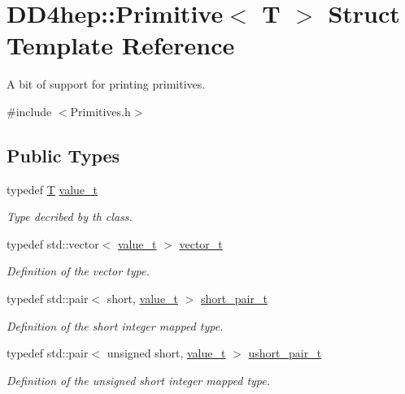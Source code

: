 \hypertarget{struct_d_d4hep_1_1_primitive}{
\section{DD4hep::Primitive$<$ T $>$ Struct Template Reference}
\label{struct_d_d4hep_1_1_primitive}
}


A bit of support for printing primitives.  


{\ttfamily \#include $<$Primitives.h$>$}\subsection*{Public Types}
\begin{DoxyCompactItemize}
\item 
typedef \hyperlink{class_t}{T} \hyperlink{struct_d_d4hep_1_1_primitive_a0639e73bb8f07f99c2d8401f807a7af6}{value\_\-t}
\begin{DoxyCompactList}\small\item\em Type decribed by th class. \item\end{DoxyCompactList}\item 
typedef std::vector$<$ \hyperlink{class_t}{value\_\-t} $>$ \hyperlink{struct_d_d4hep_1_1_primitive_a811bb3e2e990b586cd6669ce73de1c50}{vector\_\-t}
\begin{DoxyCompactList}\small\item\em Definition of the vector type. \item\end{DoxyCompactList}\item 
typedef std::pair$<$ short, \hyperlink{class_t}{value\_\-t} $>$ \hyperlink{struct_d_d4hep_1_1_primitive_a50698733dd2401e05ee0d064ef856363}{short\_\-pair\_\-t}
\begin{DoxyCompactList}\small\item\em Definition of the short integer mapped type. \item\end{DoxyCompactList}\item 
typedef std::pair$<$ unsigned short, \hyperlink{class_t}{value\_\-t} $>$ \hyperlink{struct_d_d4hep_1_1_primitive_a17a1fe85259c15331aeaa9e4f3f25ac0}{ushort\_\-pair\_\-t}
\begin{DoxyCompactList}\small\item\em Definition of the unsigned short integer mapped type. \item\end{DoxyCompactList}\item 

\end{DoxyCompactItemize}
